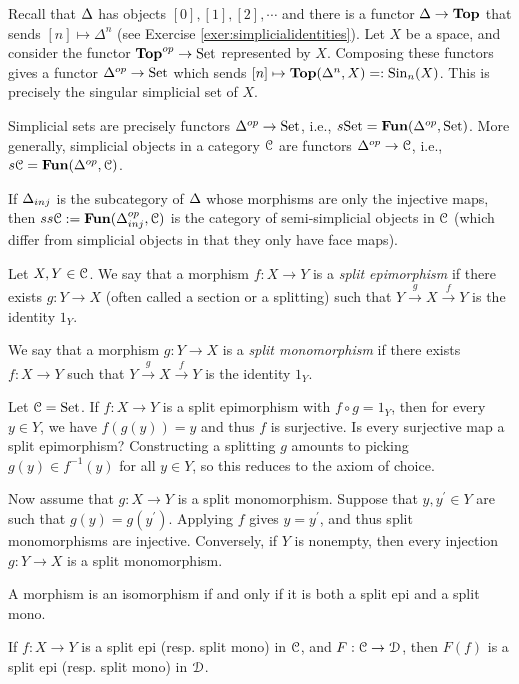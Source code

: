 Recall that ${\Delta}$ has objects $[0],[1],[2],\cdots$ and there is a functor ${\Delta}\to\mathbf{Top}$ that sends $[n]\mapsto\Delta^n$ (see Exercise \ref{exer:simplicialidentities}). Let $X$ be a space, and consider the functor $\mathbf{Top}^{op}\to{\mathrm{Set}}$ represented by $X$. Composing these functors gives a functor $\Delta^{op}\to{\mathrm{Set}}$ which sends $[n]\mapsto\mathbf{Top}(\Delta^n,X)=:\mathrm{Sin}_n(X)$. This is precisely the singular simplicial set of $X$.
\begin{prop}
Simplicial sets are precisely functors ${\Delta}^{op}\to{\mathrm{Set}}$, i.e., $s{\mathrm{Set}}=\mathbf{Fun}({\Delta}^{op},{\mathrm{Set}})$. More generally, simplicial objects in a category $\mathcal C$ are functors ${\Delta}^{op}\to\mathcal C$, i.e., $s\mathcal C=\mathbf{Fun}({\Delta}^{op},\mathcal C)$.
\end{prop}
If ${\Delta}_{inj}$ is the subcategory of ${\Delta}$ whose morphisms are only the injective maps, then $ss\mathcal C:=\mathbf{Fun}({\Delta}^{op}_{inj},\mathcal C)$ is the category of semi-simplicial objects in $\mathcal C$ (which differ from simplicial objects in that they only have face maps).
\begin{definition}
Let $X,Y\in \mathcal C$. We say that a morphism $f\colon X\rightarrow Y$ is a \emph{split epimorphism} if there exists $g:Y\to X$ (often called a section or a splitting) such that $Y\xrightarrow{g}X\xrightarrow{f}Y$ is the identity $1_Y$.

We say that a morphism $g\colon Y\rightarrow X$ is a \emph{split monomorphism} if there exists $f\colon X\to Y$ such that $Y\xrightarrow{g}X\xrightarrow{f}Y$ is the identity $1_Y$.
\end{definition}
\begin{example}
Let $\mathcal C={\mathrm{Set}}$. If $f:X\to Y$ is a split epimorphism with $f\circ g = 1_Y$, then for every $y\in Y$, we have $f(g(y))=y$ and thus $f$ is surjective. Is every surjective map a split epimorphism? Constructing a splitting $g$ amounts to picking $g(y)\in f^{-1}(y)$ for all $y\in Y$, so this reduces to the axiom of choice.

Now assume that $g: X\to Y$ is a split monomorphism. Suppose that $y,y^\prime\in Y$ are such that $g(y)=g(y^\prime)$. Applying $f$ gives $y=y^\prime$, and thus split monomorphisms are injective. Conversely, if $Y$ is nonempty, then every injection $g:Y\to X$ is a split monomorphism.
\end{example}
\begin{example}
A morphism is an isomorphism if and only if it is both a split epi and a split mono.
\end{example}
\begin{lemma}
If $f:X\to Y$ is a split epi (resp. split mono) in $\mathcal C$, and $F:\mathcal C\to \mathcal D$, then $F(f)$ is a split epi (resp. split mono) in $\mathcal D$.
\end{lemma}
